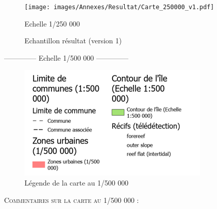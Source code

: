 \documentclass{themeensg}
\begin{document}
\begin{appendices}
\begin{figure}
\centering
\texttt{[image: images/Annexes/Resultat/Carte\_250000\_v1.pdf]}%
\caption{Echantillon résultat (version 1) }
\colorbox{red!10}{Echelle 1/250 000}
\label{100 000 v2}%
\end{figure}

\clearpage

\begin{center}
    \Large
    \colorbox{black!10}{--------------\- Echelle 1/500 000 --------------\-}
\end{center}

\begin{figure}[!h]
\centering
\includegraphics[width=\linewidth]{images/Annexes/Resultat/legende_500.png}
\caption{Légende de la carte au 1/500 000}
\label{500000_legende}
\end{figure}

\vspace{3cm}
\textsc{Commentaires sur la carte au 1/500 000 :}\\


\end{appendices}
\end{document}
